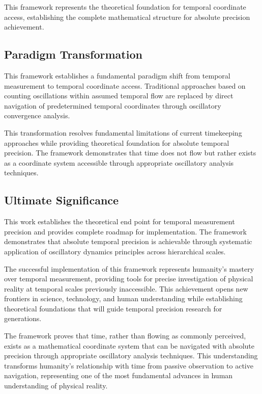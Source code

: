 \documentclass[11pt]{article}
\theoremstyle{remark}
\begin{document}
This framework represents the theoretical foundation for temporal coordinate access, establishing the complete mathematical structure for absolute precision achievement.

\subsection{Paradigm Transformation}

This framework establishes a fundamental paradigm shift from temporal measurement to temporal coordinate access. Traditional approaches based on counting oscillations within assumed temporal flow are replaced by direct navigation of predetermined temporal coordinates through oscillatory convergence analysis.

This transformation resolves fundamental limitations of current timekeeping approaches while providing theoretical foundation for absolute temporal precision. The framework demonstrates that time does not flow but rather exists as a coordinate system accessible through appropriate oscillatory analysis techniques.

\subsection{Ultimate Significance}

This work establishes the theoretical end point for temporal measurement precision and provides complete roadmap for implementation. The framework demonstrates that absolute temporal precision is achievable through systematic application of oscillatory dynamics principles across hierarchical scales.

The successful implementation of this framework represents humanity's mastery over temporal measurement, providing tools for precise investigation of physical reality at temporal scales previously inaccessible. This achievement opens new frontiers in science, technology, and human understanding while establishing theoretical foundations that will guide temporal precision research for generations.

The framework proves that time, rather than flowing as commonly perceived, exists as a mathematical coordinate system that can be navigated with absolute precision through appropriate oscillatory analysis techniques. This understanding transforms humanity's relationship with time from passive observation to active navigation, representing one of the most fundamental advances in human understanding of physical reality.
\end{document}
